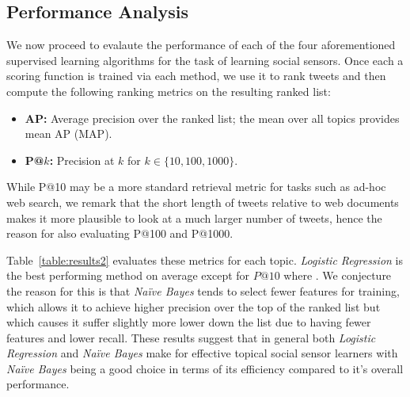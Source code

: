 \subsection{Performance Analysis}

We now proceed to evalaute the performance of each of the four
aforementioned supervised learning algorithms for the task of
learning social sensors.  Once each a scoring function is trained
via each method, we use it to rank tweets and then compute the
following ranking metrics on the resulting ranked list:
\begin{itemize}
\item {\bf AP:} Average precision over the ranked list; the mean over
all topics provides mean AP (MAP).
\item {\bf P@$k$:} Precision at $k$ for $k \in \{ 10, 100, 1000 \}$.
\end{itemize}
While P@10 may be a more standard retrieval metric for tasks such
as ad-hoc web search, we remark that the short length of tweets relative
to web documents makes it more plausible to look at a much larger number
of tweets, hence the reason for also evaluating P@100 and P@1000.

%
Table~\ref{table:results2} evaluates these metrics for each
topic. \textit{Logistic Regression} is the best performing
method on average except for $P@10$ where .  We conjecture the reason
for this is that \textit{Na\"{i}ve Bayes} tends to select fewer
features for training, which allows it to achieve higher precision
over the top of the ranked list but which causes it suffer slightly
more lower down the list due to having fewer features and lower recall.
These results suggest that in general both \textit{Logistic Regression}
and \textit{Na\"{i}ve Bayes} make for effective topical social sensor
learners with \textit{Na\"{i}ve Bayes} being a good choice in terms
of its efficiency compared to it's overall performance.

